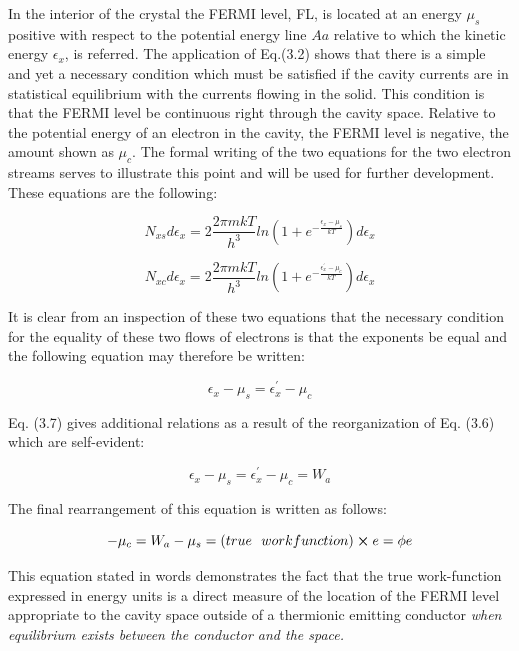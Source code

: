 \documentclass[11pt,a4paper]{article}
\begin{document}
	In the interior of the crystal the FERMI level, FL, is located at an energy $\mu_s$
	positive with respect to the potential energy line $Aa$ relative to which the kinetic
	energy $\epsilon_x$, is referred. The application of Eq.(3.2) shows that there is a simple
	and yet a necessary condition which must be satisfied if the cavity currents are
	in statistical equilibrium with the currents flowing in the solid. This condition
	is that the FERMI level be continuous right through the cavity space. Relative
	to the potential energy of an electron in the cavity, the FERMI level is negative,
	the amount shown as $\mu_c$. The formal writing of the two equations for the two
	electron streams serves to illustrate this point and will be used for further development. These equations are the following:
	
	\begin{equation}
		N_{xs}d\epsilon_x = 2 \frac{2 \pi m k T}{h^3} ln(1+e^{-\frac{\epsilon_x- \mu_s}{k T}}) d\epsilon_x
	\end{equation}
	
	\begin{equation}
		N_{xc}d\epsilon_x = 2 \frac{2 \pi m k T}{h^3} ln(1+e^{-\frac{\epsilon_x^{'}- \mu_c}{k T}}) d\epsilon_x
	\end{equation}
	
	It is clear from an inspection of these two equations that the necessary condition for the equality of these two flows of electrons is that the exponents be
	equal and the following equation may therefore be written:
	
	\begin{equation}
		\epsilon_x- \mu_s = \epsilon_x^{'}- \mu_c
	\end{equation}
	
	Eq. (3.7) gives additional relations as a result of the reorganization of Eq. (3.6)
	which are self-evident:
	
	\begin{equation}
		\epsilon_x- \mu_s = \epsilon_x^{'}- \mu_c = W_a
	\end{equation}
	
	The final rearrangement of this equation is written as follows:
	
	\begin{equation}
		-\mu_c = W_a - \mu_s = (true ~~ workfunction) \cross e = \phi e
	\end{equation}
	
	This equation stated in words demonstrates the fact that the true work-function
	expressed in energy units is a direct measure of the location of the FERMI level
	appropriate to the cavity space outside of a thermionic emitting conductor \emph{
	when equilibrium exists between the conductor and the space.}
	
\end{document}

